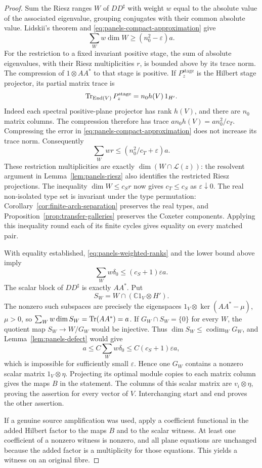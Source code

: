 \begin{proof}
Sum the Riesz ranges $W$ of $DD^\sharp$ with weight $w$ equal to the
absolute value of the associated eigenvalue, grouping conjugates with
their common absolute value.  Lidskii's theorem \cite{Simon2005} and
\eqref{eq:panels-compact-approximation} give
\[
 \sum_Ww\dim W\geq(n_0^2-\varepsilon)a.
\]
For the restriction to a fixed invariant positive stage, the sum of
absolute eigenvalues, with their Riesz multiplicities $r$, is bounded
above by its trace norm.  The compression of $1\otimes AA^*$ to that
stage is positive.  If $P_z^{\mathrm{stage}}$ is the Hilbert stage projector, its partial
matrix trace is
\[
 \operatorname{Tr}_{\operatorname{End}(V)}P_z^{\mathrm{stage}}
   =n_0h(V)\,1_{H'}.
\]
Indeed each spectral positive-plane projector has rank $h(V)$, and there
are $n_0$ matrix columns.  The compression therefore has trace
$a n_0h(V)=a n_0^2/c_T$.  Compressing the error in
\eqref{eq:panels-compact-approximation} does not increase its trace
norm.  Consequently
\begin{equation}\label{eq:panels-weighted-ranks}
 \sum_Ww r\leq(n_0^2/c_T+\varepsilon)a.
\end{equation}
These restriction multiplicities are exactly
$\dim(W\cap\mathcal L(z))$: the resolvent argument in
Lemma~\ref{lem:panels-riesz} also identifies the restricted Riesz
projections.  The inequality $\dim W\leq c_Sr$ now gives $c_T\leq c_S$
as $\varepsilon\downarrow0$.  The real non-isolated type set is invariant under the type permutation:
Corollary~\ref{cor:finite-arch-separation} preserves the real types, and
Proposition~\ref{prop:transfer-galleries} preserves the Coxeter components.
Applying this inequality round each of its finite cycles gives equality
on every matched pair.

With equality established, \eqref{eq:panels-weighted-ranks} and the lower
bound above imply
\[
 \sum_W w\delta_0\leq(c_S+1)\varepsilon a.
\]
The scalar block of $DD^\sharp$ is exactly $AA^*$.  Put
\[
 S_W=W\cap(\mathbb C1_V\otimes H').
\]
The nonzero such subspaces are precisely the eigenspaces
$1_V\otimes\ker(AA^*-\mu)$, $\mu>0$, so
$\sum_Ww\dim S_W=\operatorname{Tr}(AA^*)=a$.  If $G_W\cap S_W=\{0\}$ for every
$W$, the quotient map $S_W\to W/G_W$ would be injective.  Thus
$\dim S_W\leq\operatorname{codim}_W G_W$, and
Lemma~\ref{lem:panels-defect} would give
\[
 a\leq C\sum_Ww\delta_0\leq C(c_S+1)\varepsilon a,
\]
which is impossible for sufficiently small $\varepsilon$.  Hence one
$G_W$ contains a nonzero scalar matrix $1_V\otimes\eta$.  Projecting
its optimal module copies to each matrix column gives the maps $B$ in
the statement.  The columns of this scalar matrix are
$v_i\otimes\eta$, proving the assertion for every vector of $V$.
Interchanging start and end proves the other assertion.

If a genuine source amplification was used, apply a coefficient
functional in the added Hilbert factor to the maps $B$ and to the scalar
witness.  At least one coefficient of a nonzero witness is nonzero, and
all plane equations are unchanged because the added factor is a
multiplicity for those equations.  This yields a witness on an original
fibre.
\end{proof}

